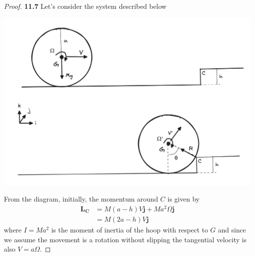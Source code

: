 \documentclass[11pt]{article}
\theoremstyle{definition}
\begin{document}
\begin{proof}{\textbf{11.7}}
    Let's consider the system described below 
    \begin{center}
        \includegraphics[scale=0.40]{ch11-7.png}
    \end{center}
    From the diagram, initially, the momentum around $C$ is given by 
    \begin{align*}
        \bm{L_C} &= M(a-h)V\bm{j} + Ma^2 \Omega\bm{j}\\
            &= M(2a-h)V\bm{j}
    \end{align*}
    where $I = Ma^2$ is the moment of inertia of the hoop with respect to $G$
    and since we assume the movement is a rotation without slipping the
    tangential velocity is also $V = a\Omega$.


\end{proof}
\end{document}
